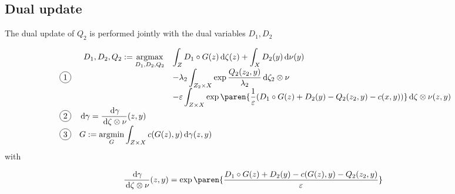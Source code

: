 \documentclass[11pt,a4paper]{article}
\begin{document}


\subsection{Dual update}

The dual update of $Q_2$ is performed jointly with the dual variables $D_1, D_2$

\begin{equation}
    \label{eqn:dual-anti-info-rotgan}
    \begin{array}{c>{\displaystyle}l}
        \circled {1} &
        \begin{array}{*2{>{\displaystyle}l}}
            D_1, D_2, Q_2 \assign \argmax_{D_1, D_2, Q_2} & \int_{Z} {D_1 \circ G(z) \d \zeta(z)} + \int_{X}{D_2(y) \d
            \nu(y)} \\
                                                          & - \lambda_2 \int_{\ZBX}{\exp{\frac{Q_2(z_2, y)}{\lambda_2}} \d \oprod{\zeta_2}{\nu}} \\
              & - \eps \int_{\ZX}{\exp{\paren{ \frac{1}{\eps}(D_1 \circ G(z) + D_2 (y) - Q_2(z_2, y) - c(x, y)) }} \d \zetaxnu(z, y)}
            \end{array} \\
        \circled{2}& \d \gamma = \radon{\gamma}{\zetaxnu}(z, y) \\
        \circled{3}& G \assign \argmin_{G} \int_{\ZX}c(G(z), y) \d \gamma(z, y)
    \end{array}
\end{equation}
with

\begin{align}
    \label{eqn:primal-dual-anti-info-rotgan}
    \radon{\gamma}{\zetaxnu}(z,y)
                      &=\exp\paren{\frac{D_1 \circ G(z) + D_2(y) - c(G(z), y) - Q_2(z_2, y)}{\eps}}
\end{align}
\end{document}
